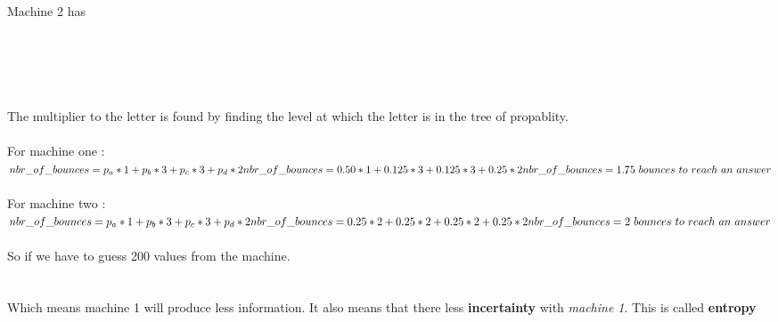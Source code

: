 \documentclass{article}
\begin{document}
    \\
    \\
    \\
    \\
    [4mm]
    Machine 2 has \\
    \\
    \\
    \\
    \\
    \\
    [4mm]
    The multiplier to the letter is found by finding the level at which the letter
    is in the tree of propablity.
    \\
    [2mm]
    \\
    For machine one :\\
    [1mm]
    \begin{math}
      nbr\_of\_bounces = p_a * 1 + p_b * 3 + p_c * 3 + p_d * 2\\
      nbr\_of\_bounces = 0.50 * 1 + 0.125 * 3 + 0.125 * 3 + 0.25 * 2\\
      nbr\_of\_bounces = 1.75\ bounces\ to\ reach\ an\ answer
    \end{math}
    \\
    [2mm]
    \\
    For machine two :\\
    [1mm]
    \begin{math}
      nbr\_of\_bounces = p_a * 1 + p_b * 3 + p_c * 3 + p_d * 2\\
      nbr\_of\_bounces = 0.25 * 2 + 0.25 * 2 + 0.25 * 2 + 0.25 * 2\\
      nbr\_of\_bounces = 2\ bounces\ to\ reach\ an\ answer
    \end{math}
    \\
    [4mm]
    \\
    So if we have to guess 200 values from the machine.\\
    [2mm]
    \\
    [1mm]
    \\
    [2mm]
    Which means machine 1 will produce less information. It also means
    that there less \textbf{incertainty} with \textit{machine 1}. This is called \textbf{entropy}
\end{document}
